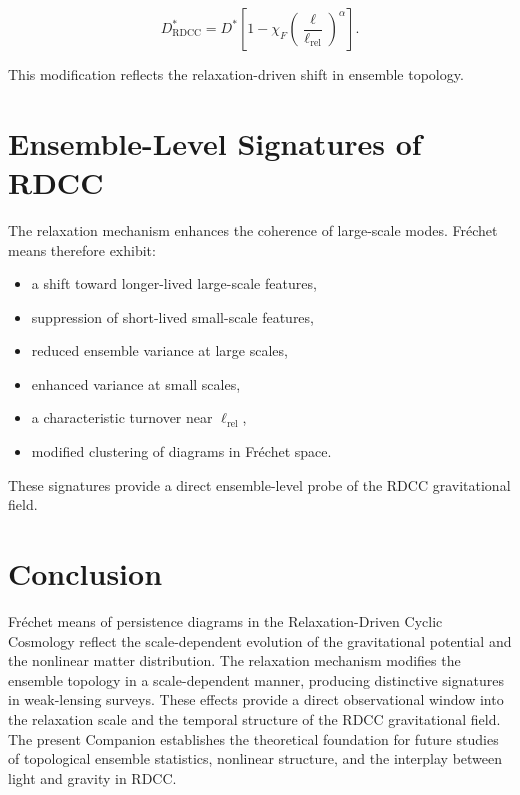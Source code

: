 \documentclass[11pt,a4paper]{article}
\begin{document}
\begin{equation}
    D^{*}_{\mathrm{RDCC}}
    = D^{*}
      \left[
        1 - \chi_{F}
        \left(\frac{\ell}{\ell_{\mathrm{rel}}}\right)^{\alpha}
      \right].
\end{equation}

This modification reflects the relaxation-driven shift in ensemble topology.
\section{Ensemble-Level Signatures of RDCC}

The relaxation mechanism enhances the coherence of large-scale modes. Fréchet 
means therefore exhibit:

\begin{itemize}
    \item a shift toward longer-lived large-scale features,
    \item suppression of short-lived small-scale features,
    \item reduced ensemble variance at large scales,
    \item enhanced variance at small scales,
    \item a characteristic turnover near $\ell_{\mathrm{rel}}$,
    \item modified clustering of diagrams in Fréchet space.
\end{itemize}

These signatures provide a direct ensemble-level probe of the RDCC gravitational 
field.
\section{Conclusion}

Fréchet means of persistence diagrams in the Relaxation-Driven Cyclic Cosmology 
reflect the scale-dependent evolution of the gravitational potential and the 
nonlinear matter distribution. The relaxation mechanism modifies the ensemble 
topology in a scale-dependent manner, producing distinctive signatures in 
weak-lensing surveys. These effects provide a direct observational window into the 
relaxation scale and the temporal structure of the RDCC gravitational field. The 
present Companion establishes the theoretical foundation for future studies of 
topological ensemble statistics, nonlinear structure, and the interplay between 
light and gravity in RDCC.


\nocite{*}

\end{document}
